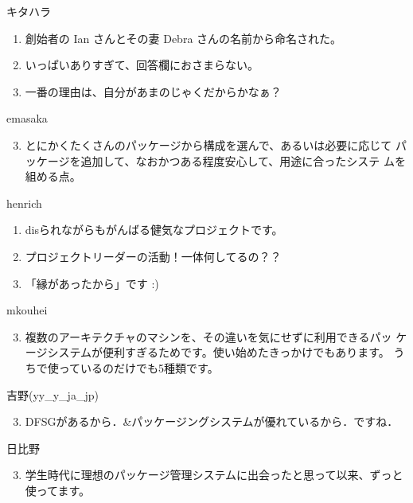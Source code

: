 \begin{prework}{ キタハラ }
\begin{enumerate}
\item 創始者の Ian さんとその妻 Debra さんの名前から命名された。 
\item いっぱいありすぎて、回答欄におさまらない。
\item 一番の理由は、自分があまのじゃくだからかなぁ？
\end{enumerate}
\end{prework}
\begin{prework}{ emasaka }
\begin{enumerate}
\setcounter{enumi}{2}
\item とにかくたくさんのパッケージから構成を選んで、あるいは必要に応じて
      パッケージを追加して、なおかつある程度安心して、用途に合ったシステ
      ムを組める点。
\end{enumerate}
\end{prework}
\begin{prework}{ henrich }
\begin{enumerate}
\item disられながらもがんばる健気なプロジェクトです。
\item プロジェクトリーダーの活動！一体何してるの？？
\item 「縁があったから」です :)
\end{enumerate}
\end{prework}
\begin{prework}{ mkouhei }
\begin{enumerate}
\setcounter{enumi}{2}
\item 複数のアーキテクチャのマシンを、その違いを気にせずに利用できるパッ
      ケージシステムが便利すぎるためです。使い始めたきっかけでもあります。
      うちで使っているのだけでも5種類です。
\end{enumerate}
\end{prework}
\begin{prework}{ 吉野(yy\_y\_ja\_jp) }
\begin{enumerate}
\setcounter{enumi}{2}
\item DFSGがあるから．\&パッケージングシステムが優れているから．ですね．
\end{enumerate}
\end{prework}
\begin{prework}{ 日比野 }
\begin{enumerate}
\setcounter{enumi}{2}
\item 学生時代に理想のパッケージ管理システムに出会ったと思って以来、ずっと使ってます。
\end{enumerate}
\end{prework}
